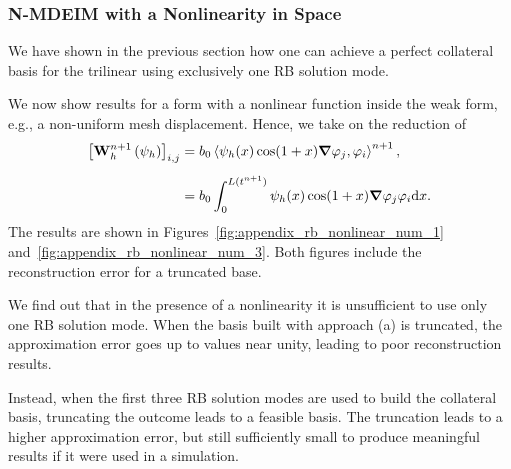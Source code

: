\documentclass[../../thesis.tex]{subfiles}
\newcommand{\inner}[2]{\left<#1, #2\right>}
\newcommand{\Ah}[1]{\ensuremath{\vb{#1}^{n+1}_h}}
\begin{document}
\subsubsection{N-MDEIM with a Nonlinearity in Space}
We have shown in the previous section how 
one can achieve a perfect collateral basis for the trilinear using exclusively one RB solution mode.

We now show results for a form with a nonlinear function inside the weak form, e.g., 
a non-uniform mesh displacement. 
Hence, we take on the reduction of
\begin{equation}
    \begin{split}
        \qty[\Ah{W}\left(\psi_{h}\right)]_{i,j}
        &= b_0 \inner{\psi_h(x) \cos(1+x) \grad \varphi_j}{\varphi_i}^{n+1},
        \\[2mm]
        &= b_0 \int_{0}^{L(t^{n+1})} \psi_h(x) \cos(1+x) \grad \varphi_j \varphi_i \dd x.
    \end{split}
\end{equation}
The results are shown in Figures~\ref{fig:appendix_rb_nonlinear_num_1} 
and~\ref{fig:appendix_rb_nonlinear_num_3}.
Both figures include the reconstruction error for a truncated base.

We find out that in the presence of a nonlinearity it is unsufficient to use only 
one RB solution mode. 
When the basis built with approach (a) is truncated, the approximation error goes up 
to values near unity,
leading to poor reconstruction results.

Instead, when the first three RB solution modes are used to build the collateral basis,
truncating the outcome leads to a feasible basis.
The truncation leads to a higher approximation error, but still sufficiently small to produce
meaningful results if it were used in a simulation.    
\end{document}
